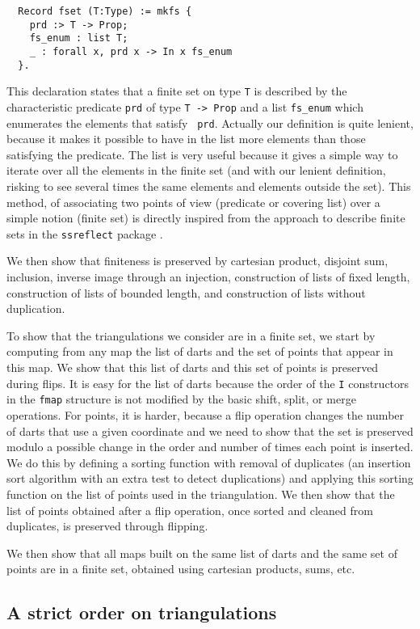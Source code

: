 \documentclass{llncs}
\begin{document}
\begin{verbatim}
  Record fset (T:Type) := mkfs {
    prd :> T -> Prop;
    fs_enum : list T;
    _ : forall x, prd x -> In x fs_enum
  }.
\end{verbatim}
This declaration states that a finite set on type {\tt T} is described
by the characteristic predicate {\tt prd} of type {\tt T -> Prop} and
a list {\tt fs\_enum} which enumerates the elements that satisfy {\tt
  prd}.  Actually our definition is quite lenient, because it makes it
possible to have in the list more elements than those satisfying the
predicate.  The list is very useful because it gives a simple way to
iterate over all the elements in the finite set (and with
our lenient definition, risking to see several times the
same elements and elements outside the set).  This
method, of associating two points of view (predicate or covering list)
over a simple notion (finite set) is directly inspired from the approach
to describe finite sets in the {\tt ssreflect} package \cite{GMRTT:GROUPS07}.

We then show that finiteness is preserved by cartesian product, 
disjoint sum, inclusion, inverse image through an injection, construction
of lists of fixed length, construction of lists of bounded length,
and construction of lists without duplication.

To show that the triangulations we consider are in a finite set, we
start by computing from any map the list of darts and the set of points
that appear in this map.  We show that this list of darts and this set of
points is preserved during flips.  It is easy for the list of darts because
the order of the {\tt I} constructors in the {\tt fmap} structure is not
modified by the basic shift, split, or merge operations.  For points, it is
harder, because a flip operation changes the number of darts that use
a given coordinate and we need to show that the set is preserved modulo
a possible change in the order and number of times each point is inserted.
We do this by defining a sorting function with removal of duplicates (an
insertion sort algorithm with an extra test to detect duplications) and applying
this sorting function on the list of points used in the triangulation.  We then
show that the list of points obtained after a flip operation, once sorted and
cleaned from duplicates, is preserved through flipping.

We then show that all maps built on the same list of darts and the same
set of points are in a finite set, obtained using cartesian products, sums,
etc.
\subsection{A strict order on triangulations}
\end{document}
